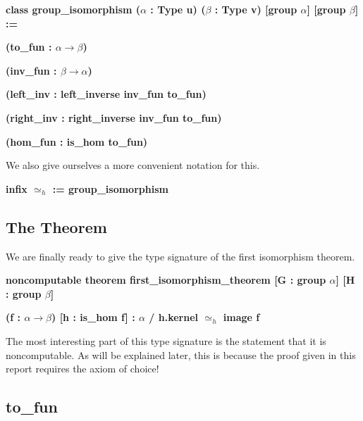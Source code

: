 \documentclass[runningheads,a4paper]{llncs}
\renewcommand{\a}{\alpha}
\renewcommand{\b}{\beta}
\renewcommand{\-}{\setminus}
\begin{document}
\vspace{2 mm}
\hspace{2 em}\textbf{class group\_isomorphism ($\a$ : Type u) ($\b$ : Type v) [group $\a$] [group $\b$] :=}

\hspace{4 em}\textbf{(to\_fun    : $\a \to \b$)}

\hspace{4 em}\textbf{(inv\_fun    : $\b \to \a$)}

\hspace{4 em}\textbf{(left\_inv  : left\_inverse inv\_fun to\_fun)}

\hspace{4 em}\textbf{(right\_inv : right\_inverse inv\_fun to\_fun)}

\hspace{4 em}\textbf{(hom\_fun : is\_hom to\_fun)}
\vspace{2 mm}

We also give ourselves a more convenient notation for this.

\vspace{2 mm}
\hspace{2 em}\textbf{infix $\simeq_h$ := group\_isomorphism}
\vspace{2 mm}

\subsection{The Theorem}

We are finally ready to give the type signature of the first isomorphism theorem.

\vspace{2 mm}
\hspace{2 em}\textbf{noncomputable theorem first\_isomorphism\_theorem [G : group $\a$] [H : group $\b$]}

\hspace{4 em}\textbf{(f : $\a \to \b$) [h : is\_hom f] : $\a$ / h.kernel $\simeq_h$ image f}
\vspace{2 mm}

The most interesting part of this type signature is the statement that it is noncomputable. As will be explained later, this is because the proof given in this report requires the axiom of choice!

\subsection{to\_fun}
\end{document}
